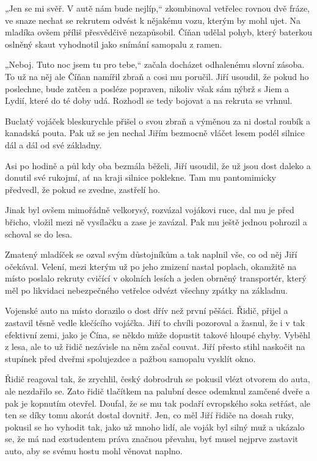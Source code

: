 „Jen se mi svěř. V autě nám bude nejlíp,“ zkombinoval vetřelec rovnou dvě fráze, ve snaze nechat se rekrutem odvést k nějakému vozu, kterým by mohl ujet. Na mladíka ovšem příliš přesvědčivě nezapůsobil. Číňan udělal pohyb, který baterkou oslněný skaut vyhodnotil jako snímání samopalu z ramen.

„Neboj. Tuto noc jsem tu pro tebe,“ začala docházet odhalenému slovní zásoba. To už na něj ale Číňan namířil zbraň a cosi mu poručil. Jiří usoudil, že pokud ho poslechne, bude zatčen a posléze popraven, nikoliv však sám nýbrž s Jiem a Lydií, které do té doby udá. Rozhodl se tedy bojovat a na rekruta se vrhnul.

Buclatý vojáček bleskurychle přišel o svou zbraň a výměnou za ni dostal roubík a kanadská pouta. Pak už se jen nechal Jiřím bezmocně vláčet lesem podél silnice dál a dál od své základny.

Asi po hodině a půl kdy oba bezmála běželi, Jiří usoudil, že už jsou dost daleko a donutil své rukojmí, ať na kraji silnice poklekne. Tam mu pantomimicky předvedl, že pokud se zvedne, zastřelí ho.

Jinak byl ovšem mimořádně velkorysý, rozvázal vojákovi ruce, dal mu je před břicho, vložil mezi ně vysílačku a zase je zavázal. Pak mu ještě jednou pohrozil a schoval se do lesa.

Zmatený mladíček se ozval svým důstojníkům a tak naplnil vše, co od něj Jiří očekával. Velení, mezi kterým už po jeho zmizení nastal poplach, okamžitě na místo poslalo rekruty cvičící v okolních lesích a jeden obrněný transportér, který měl po likvidaci nebezpečného vetřelce odvézt všechny zpátky na základnu.

Vojenské auto na místo dorazilo o dost dřív než první pěšáci. Řidič, přijel a zastavil těsně vedle klečícího vojáčka. Jiří to chvíli pozoroval a žasnul, že i v tak efektivní zemi, jako je Čína, se někdo může dopustit takové hloupé chyby. Vyběhl z lesa, ale to už řidič nezávisle na něm začal couvat. Jiří přesto stihl naskočit na stupínek před dveřmi spolujezdce a pažbou samopalu vysklít okno.

Řidič reagoval tak, že zrychlil, český dobrodruh se pokusil vlézt otvorem do auta, ale nezdařilo se. Zato řidič tlačítkem na palubní desce odemknul zamčené dveře a pak je kopnutím otevřel. Doufal, že se mu tak podaří evropského soka setřást, ale ten se díky tomu akorát dostal dovnitř. Jen, co měl Jiří řidiče na dosah ruky, pokusil se ho vyhodit tak, jako už mnoho lidí, ale voják byl silný muž a ukázalo se, že má nad exstudentem práva značnou převahu, byť musel nejprve zastavit auto, aby se svému hostu mohl věnovat naplno.

